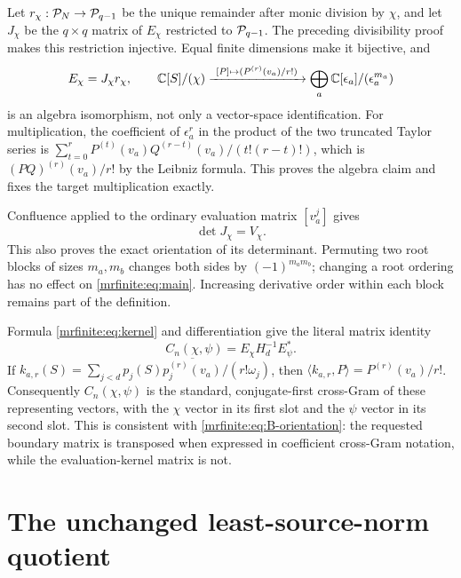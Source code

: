 Let \(r_\chi:\mathcal P_N\to\mathcal P_{q-1}\) be the unique remainder after monic
division by \(\chi\), and let \(J_\chi\) be the \(q\times q\) matrix
of \(E_\chi\) restricted to \(\mathcal P_{q-1}\). The preceding divisibility
proof makes this restriction injective. Equal finite dimensions make it
bijective, and
\begin{equation}\label{mrfinite:eq:E-factor}
 E_\chi=J_\chi r_\chi,
 \qquad
 \mathbb C[S]/(\chi)\xrightarrow{\ [P]\mapsto(P^{(r)}(v_a)/r!)\ }
 \bigoplus_a\mathbb C[\epsilon_a]/(\epsilon_a^{m_a})
\end{equation}
is an algebra isomorphism, not only a vector-space identification.
For multiplication, the coefficient of \(\epsilon_a^r\) in the product
of the two truncated Taylor series is
\(\sum_{t=0}^r P^{(t)}(v_a)Q^{(r-t)}(v_a)/(t!(r-t)!)\), which is
\((PQ)^{(r)}(v_a)/r!\) by the Leibniz formula. This proves the algebra
claim and fixes the target multiplication exactly.

Confluence applied to the ordinary evaluation matrix
\([v_a^j]\) gives
\begin{equation}\label{mrfinite:eq:detJ}
 \det J_\chi=V_\chi.
\end{equation}
This also proves the exact orientation of its determinant. Permuting two
root blocks of sizes \(m_a,m_b\) changes both sides by
\((-1)^{m_am_b}\); changing a root ordering has no effect on
\eqref{mrfinite:eq:main}. Increasing derivative order within each block remains
part of the definition.

Formula \eqref{mrfinite:eq:kernel} and differentiation give the literal matrix
identity
\begin{equation}\label{mrfinite:eq:C-matrix}
 C_n(\chi,\psi)=E_\chi H_d^{-1}E_\psi^*.
\end{equation}
If \(k_{a,r}(S)=\sum_{j<d}p_j(S)
\overline{p_j^{(r)}(v_a)}/(r!\omega_j)\), then
\(\langle k_{a,r},P\rangle=P^{(r)}(v_a)/r!\).
Consequently \(C_n(\chi,\psi)\) is the standard, conjugate-first
cross-Gram of these representing vectors, with the \(\chi\) vector
in its first slot and the \(\psi\) vector in its second slot.
This is consistent with \eqref{mrfinite:eq:B-orientation}: the requested boundary
matrix is transposed when expressed in coefficient cross-Gram notation,
while the evaluation-kernel matrix is not.

\section{The unchanged least-source-norm quotient}\label{mrfinite:sec:quotient}

